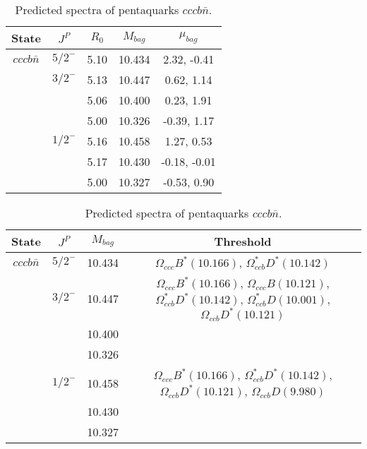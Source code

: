 \documentclass[prd,twocolumn,floatfix,nofootinbib]{revtex4}
\begin{document}
\renewcommand{\tabcolsep}{0.5cm}
\renewcommand{\arraystretch}{1.2}
\begin{table*}[!htbp]
    \caption{Predicted spectra of pentaquarks $cccb\bar{n}$.}
    \begin{tabular}{ccccc}
        \hline\hline
        {\rm State} &$J^{P}$ &$R_{0}$ &$M_{bag}$ &$\mu_{bag}$ \\ \hline
        ${cccb\bar{n}}$
            &${5/2}^{-}$    &5.10   &10.434 &2.32, -0.41 \\
            &${3/2}^{-}$    &5.13   &10.447 &0.62, 1.14 \\
            &               &5.06   &10.400 &0.23, 1.91 \\
            &               &5.00   &10.326 &-0.39, 1.17 \\
            &${1/2}^{-}$    &5.16   &10.458 &1.27, 0.53 \\
            &               &5.17   &10.430 &-0.18, -0.01 \\
            &               &5.00   &10.327 &-0.53, 0.90 \\
        \hline\hline
    \end{tabular}
\end{table*}

\renewcommand{\tabcolsep}{0.5cm}
\renewcommand{\arraystretch}{1.2}
\begin{table*}[!htbp]
    \caption{Predicted spectra of pentaquarks $cccb\bar{n}$.}
    \begin{tabular}{cccc}
        \hline\hline
        {\rm State} &$J^{P}$ &$M_{bag}$ &Threshold \\ \hline
        ${cccb\bar{n}}$
            &${5/2}^{-}$    &10.434 &$\Omega_{ccc} B^{\ast}(10.166)$, $\Omega^{\ast}_{ccb} D^{\ast}(10.142)$ \\
            &${3/2}^{-}$    &10.447 &$\Omega_{ccc} B^{\ast}(10.166)$, $\Omega_{ccc} B(10.121)$, $\Omega^{\ast}_{ccb} D^{\ast}(10.142)$, $\Omega^{\ast}_{ccb} D(10.001)$, $\Omega_{ccb} D^{\ast}(10.121)$ \\
            &               &10.400 & \\
            &               &10.326 & \\
            &${1/2}^{-}$    &10.458 &$\Omega_{ccc} B^{\ast}(10.166)$, $\Omega^{\ast}_{ccb} D^{\ast}(10.142)$, $\Omega_{ccb} D^{\ast}(10.121)$, $\Omega_{ccb} D(9.980)$ \\
            &               &10.430 & \\
            &               &10.327 & \\
        \hline\hline
    \end{tabular}
\end{table*}
\end{document}
